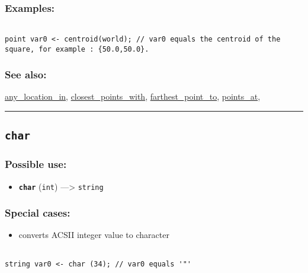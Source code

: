 \documentclass[]{book}
\providecommand{\tightlist}{%
  \setlength{\itemsep}{0pt}\setlength{\parskip}{0pt}}
\theoremstyle{definition}
\theoremstyle{definition}
\theoremstyle{definition}
\theoremstyle{remark}
\begin{document}
\subsubsection{Examples:}\label{examples-63}

\begin{verbatim}
 
point var0 <- centroid(world); // var0 equals the centroid of the square, for example : {50.0,50.0}.
\end{verbatim}

\subsubsection{See also:}\label{see-also-51}

\href{operators-a-to-a.html\#any_location_in}{any\_location\_in},
\href{operators-b-to-c.html\#closest_points_with}{closest\_points\_with},
\href{operators-d-to-h.html\#farthest_point_to}{farthest\_point\_to},
\href{operators-n-to-r.html\#points_at}{points\_at},

\begin{center}\rule{0.5\linewidth}{\linethickness}\end{center}

\subsection{\texorpdfstring{\texttt{char}}{char}}\label{char}

\subsubsection{Possible use:}\label{possible-use-82}

\begin{itemize}
\tightlist
\item
  \textbf{\texttt{char}} (\texttt{int}) ---\textgreater{}
  \texttt{string}
\end{itemize}

\subsubsection{Special cases:}\label{special-cases-27}

\begin{itemize}
\tightlist
\item
  converts ACSII integer value to character
\end{itemize}

\begin{verbatim}
 
string var0 <- char (34); // var0 equals '"'
\end{verbatim}
\end{document}

